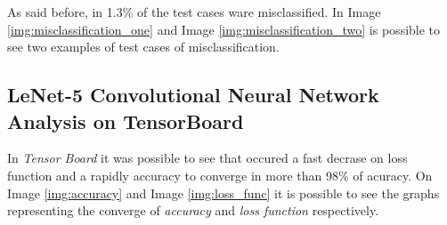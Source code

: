 \documentclass[journal]{IEEEtran}
\begin{document}
As said before, in 1.3\% of the test cases ware misclassified. In Image \ref{img:misclassification_one} and Image \ref{img:misclassification_two} is possible to see two examples of test cases of misclassification.

%

\subsection{LeNet-5 Convolutional Neural Network Analysis on TensorBoard}

In \textit{Tensor Board} it was possible to see that occured a fast decrase on loss function and a rapidly accuracy to converge in more than 98\% of acuracy. On Image \ref{img:accuracy} and Image \ref{img:loss_func} it is possible to see the graphs representing the converge of \textit{accuracy} and \textit{loss function} respectively.

%
\end{document}
